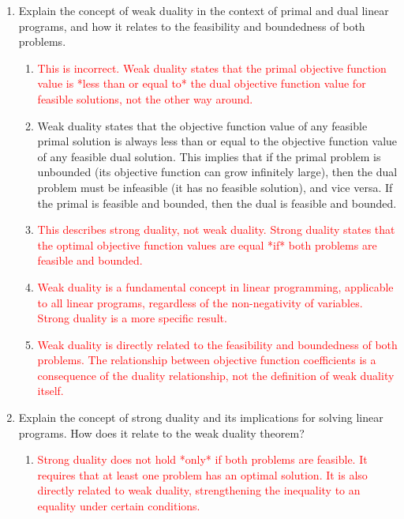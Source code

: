 \documentclass{article}%
\newcommand{\incorrect}[1]{\textcolor{red}{#1}}
\begin{document}
\begin{enumerate}
\begin{enumerate}
\begin{enumerate}
\item \incorrect{This is incorrect; the feasibility is independent of the right-hand side vector b.}%
\end{enumerate}%
\vspace{0.5em}%
\end{enumerate}%
\item Explain the concept of weak duality in the context of primal and dual linear programs, and how it relates to the feasibility and boundedness of both problems.%
\begin{enumerate}%
\item \incorrect{This is incorrect.  Weak duality states that the primal objective function value is *less than or equal to* the dual objective function value for feasible solutions, not the other way around.}%
\item Weak duality states that the objective function value of any feasible primal solution is always less than or equal to the objective function value of any feasible dual solution. This implies that if the primal problem is unbounded (its objective function can grow infinitely large), then the dual problem must be infeasible (it has no feasible solution), and vice versa.  If the primal is feasible and bounded, then the dual is feasible and bounded.%
\item \incorrect{This describes strong duality, not weak duality. Strong duality states that the optimal objective function values are equal *if* both problems are feasible and bounded.}%
\item \incorrect{Weak duality is a fundamental concept in linear programming, applicable to all linear programs, regardless of the non-negativity of variables. Strong duality is a more specific result.}%
\item \incorrect{Weak duality is directly related to the feasibility and boundedness of both problems.  The relationship between objective function coefficients is a consequence of the duality relationship, not the definition of weak duality itself.}%
\end{enumerate}%
\vspace{1em}%
\item Explain the concept of strong duality and its implications for solving linear programs.  How does it relate to the weak duality theorem?%
\begin{enumerate}%
\item \incorrect{Strong duality does not hold *only* if both problems are feasible. It requires that at least one problem has an optimal solution.  It is also directly related to weak duality, strengthening the inequality to an equality under certain conditions.}%

\end{enumerate}
\end{enumerate}
\end{document}
